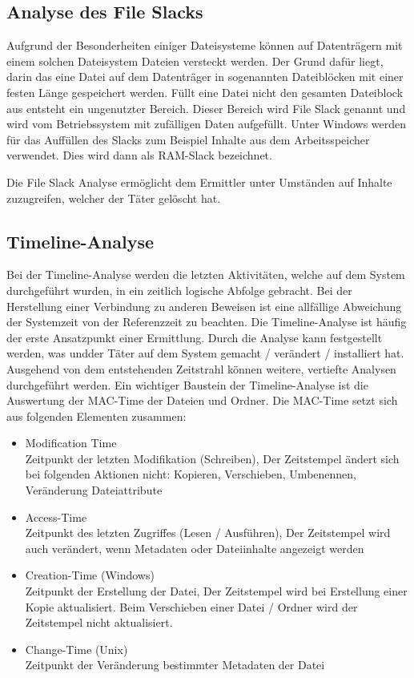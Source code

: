 \subsection{Analyse des File Slacks}
Aufgrund der Besonderheiten einiger Dateisysteme können auf Datenträgern mit einem solchen Dateisystem Dateien versteckt werden. Der Grund dafür liegt, darin das eine Datei auf dem Datenträger in sogenannten Dateiblöcken mit einer festen Länge gespeichert werden. Füllt eine Datei nicht den gesamten Dateiblock aus entsteht ein ungenutzter Bereich. Dieser Bereich wird File Slack genannt und wird vom Betriebssystem mit zufälligen Daten aufgefüllt. Unter Windows werden für das Auffüllen des Slacks zum Beispiel Inhalte aus dem Arbeitsspeicher verwendet. Dies wird dann als RAM-Slack bezeichnet.


Die File Slack Analyse ermöglicht dem Ermittler unter Umständen auf Inhalte zuzugreifen, welcher der Täter gelöscht hat.

\subsection{Timeline-Analyse}
Bei der Timeline-Analyse werden die letzten Aktivitäten, welche auf dem System durchgeführt wurden, in ein zeitlich logische Abfolge gebracht. Bei der Herstellung einer Verbindung zu anderen Beweisen ist eine allfällige Abweichung der Systemzeit von der Referenzzeit zu beachten. Die Timeline-Analyse ist häufig der erste Ansatzpunkt einer Ermittlung. Durch die Analyse kann festgestellt werden, was undder Täter auf dem System gemacht / verändert / installiert hat. Ausgehend von dem entstehenden Zeitstrahl können weitere, vertiefte Analysen durchgeführt werden. Ein wichtiger Baustein der Timeline-Analyse ist die Auswertung der MAC-Time der Dateien und Ordner. Die MAC-Time setzt sich aus folgenden Elementen zusammen:

\begin{itemize}
\item Modification Time\\
Zeitpunkt der letzten Modifikation (Schreiben), Der Zeitstempel ändert sich bei folgenden Aktionen nicht: Kopieren, Verschieben, Umbenennen, Veränderung Dateiattribute
\item Access-Time\\
Zeitpunkt des letzten Zugriffes (Lesen / Ausführen), Der Zeitstempel wird auch verändert, wenn Metadaten oder Dateiinhalte angezeigt werden
\item Creation-Time (Windows)\\
Zeitpunkt der Erstellung der Datei, Der Zeitstempel wird bei Erstellung einer Kopie aktualisiert. Beim Verschieben einer Datei / Ordner wird der Zeitstempel nicht aktualisiert.
\item Change-Time (Unix)\\
Zeitpunkt der Veränderung bestimmter Metadaten der Datei
\end{itemize}

